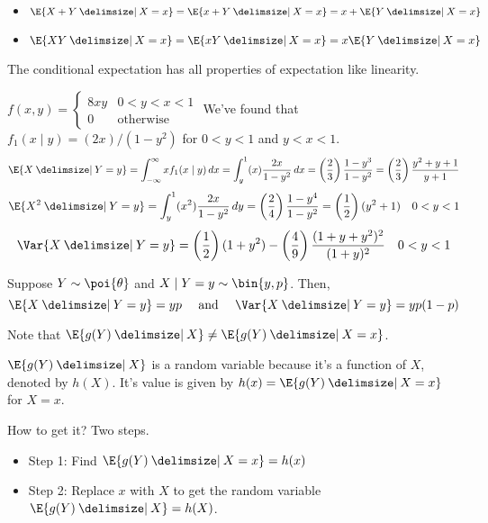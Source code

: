 \begin{Example}{}{}
    \begin{itemize}
        \item $ \E{X+Y\given X=x}=\E{x+Y\given X=x}=x+\E{Y\given X=x} $
        \item $ \E{XY\given X=x}=\E{xY\given X=x}=x\E{Y\given X=x} $
    \end{itemize}
\end{Example}
\begin{Theorem}{}{}
    The conditional expectation has all properties of expectation like
    linearity.
\end{Theorem}
\begin{Example}{}{}
    $ \displaystyle f(x,y)=\begin{cases}
            8 x y & 0<y<x<1          \\
            0     & \text{otherwise}
        \end{cases} $
    We've found that $ f_1(x\mid y)=(2x)/(1-y^2) $ for $ 0<y<1 $ and $ y<x<1 $.
    \[ \E{X\given Y=y}=\int_{-\infty}^{\infty} x f_1(x\mid y)\, d{x}=
        \int_{y}^{1} (x) \frac{2x}{1-y^2}\, d{x}=\left( \frac{2}{3} \right)
        \frac{1-y^3}{1-y^2}=\left( \frac{2}{3}  \right)
        \frac{y^2+y+1}{y+1}   \]
    \[ \E{X^2\given Y=y}=\int_{y}^{1} (x^2)
        \frac{2x}{1-y^2} \, d{y}=\left( \frac{2}{4} \right)
        \frac{1-y^4}{1-y^2}=\left( \frac{1}{2}  \right)(y^2+1)\quad 0<y<1 \]
    \[ \Var{X\given Y=y}=\left( \frac{1}{2} \right) (1+y^2)-
        \left( \frac{4}{9}  \right)\frac{(1+y+y^2)^2}{(1+y)^2}\quad 0<y<1  \]
\end{Example}
\begin{Example}{}{}
    Suppose $ Y \sim \poi{\theta} $ and $ X\mid Y=y \sim \bin{y,p} $. Then,
    \[ \E{X\given Y=y}=yp\quad\text{ and }\quad\Var{X\given Y=y}=yp(1-p) \]
\end{Example}
\begin{Remark}{}{}
    Note that $ \E{g(Y)\given X}\neq \E{g(Y)\given X=x} $.

    $ \E{g(Y)\given X} $ is a random variable because it's a function
    of $ X $, denoted by $ h(X) $. It's value is given by $ h(x)=
        \E{g(Y)\given X=x} $ for $ X=x $.

    How to get it? Two steps.
    \begin{itemize}
        \item Step 1: Find $ \E{g(Y)\given X=x}=h(x) $
        \item Step 2: Replace $ x $ with
              $ X $ to get the random variable $ \E{g(Y)\given X}=h(X) $.
    \end{itemize}
\end{Remark}
